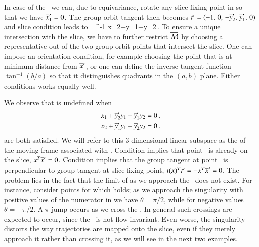 \documentclass[preprint,number,sort&compress]{elsarticle}
\begin{document}
In case of the \cLe\ we can, due to equivariance, rotate any
slice fixing point in  so that we have
${\overline{x}'_{1}}=0$.
The group orbit tangent then becomes
$t'_{}=(-1,\,0,\,-{\overline{y}'_{2}},\,{\overline{y}'_{1}},\,0)$
and slice condition  leads to
\beq
  \theta=\tan^{-1}
			  {x_2+y_1+y_2}\,.
To ensure a unique intersection with the slice, we have to
further restrict $\pSRed$ by choosing a representative out of
the two group orbit points that intersect the slice. One can
impose an orientation condition, for example choosing the
point that is at minimum distance from $\slicep$, or one can
define the inverse tangent function $\tan^{-1}({b}/{a})$ so
that it distinguishes quadrants in the $(a,b)$ plane. Either
conditions works equally well.

We observe that  is undefined when
\begin{subequations}\label{cLeMFsing}
  \begin{align}
    x_1+\slicepComp{y}{2}y_1-\slicepComp{y}{1}y_2 &=0 \label{cLeMFsingOnSlice}\cont
    x_2+\slicepComp{y}{1}y_1+\slicepComp{y}{2}y_2 &=0 \label{cLeMFsingPerpTan}\,.
  \end{align}
\end{subequations}
are both satisfied. We will refer to this $3$-dimensional
linear subspace as the \emph{\sset} of the moving frame
associated with . Condition
 implies that point \ssp\ is already
on the slice, $x^T{\overline{x}'}=0$. Condition
 implies that the group tangent at
point \ssp\ is perpendicular to group tangent at slice fixing
point, $t{}(x)^Tt'_{}=-x^T{\overline{x}'}=0$. The
problem lies in the fact that the limit of 
as we approach the \sset\ does not exist. For instance,
consider points for which  holds; as
we approach the singularity with positive values of the
numerator in  we have $\theta=\pi/2$, while for
negative values $\theta=-\pi/2$. A $\pi$-jump occurs as we
cross the \sset. In general such crossings are expected to
occur, since the \sset\ is not flow in\-vari\-ant. Even
worse, the singularity distorts the way trajectories are
mapped onto the slice, even if they merely approach it rather
than crossing it, as we will see in the next two examples.
\end{document}
